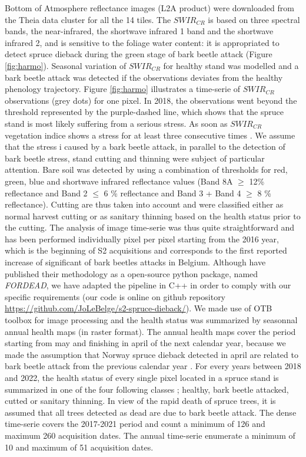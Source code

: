 \documentclass[3p,procedia]{elsarticle}
\begin{document}
Bottom of Atmosphere reflectance images (L2A product) were downloaded from the Theia data cluster \citep{theia_team} for all the 14 tiles.
The $SWIR_{CR}$ is based on three spectral bands, the near-infrared, the shortwave infrared 1 band and the shortwave infrared 2, and is sensitive to the foliage water content: it is appropriated to detect spruce dieback during the green stage of bark beetle attack (Figure \ref{fig:harmo}).
Seasonal variation of $SWIR_{CR}$ for healthy stand was modelled and a bark beetle attack was detected if the observations deviates from the healthy phenology trajectory. 
Figure \ref{fig:harmo} illustrates a time-serie of $SWIR_{CR}$ observations (grey dots) for one pixel. 
In 2018, the observations went beyond the threshold represented by the purple-dashed line, which shows that the spruce stand is most likely suffering from a serious stress.
As soon as $SWIR_{CR}$ vegetation indice shows a stress for at least three consecutive times \cite{dutrieux_package_2021}.
We assume that the stress i caused by a bark beetle attack, in parallel to the detection of bark beetle stress, stand cutting and thinning were subject of particular attention. 
Bare soil was detected by using a combination of thresholds for red, green, blue and shortwave infrared reflectance values (Band 8A $\geq$ 12\% reflectance and Band 2 $\leq$ 6 \% reflectance and Band 3 + Band 4 $\geq$ 8 \% reflectance).
Cutting are thus taken into account and were classified either as normal harvest cutting or as sanitary thinning based on the health status prior to the cutting.
The analysis of image time-serie was thus quite straightforward and has been performed individually pixel per pixel starting from the 2016 year, which is the beginning of S2 acquisitions and corresponds to the first reported increase of significant of bark beetles attacks in Belgium. 
Although \cite{dutrieux_package_2021} have published their methodology as a open-source python package, named \textit{FORDEAD}, we have adapted the pipeline in C++ in order to comply with our specific requirements (our code is online on github repository \url{https://github.com/JoLeBelge/s2-spruce-dieback/}). 
We made use of OTB toolbox \citep{grizonnet_2017_OTB} for image processing and the health status was summarized by seasonnal annual health maps (in raster format).
The annual health maps cover the period starting from may and finishing in april of the next calendar year, because we made the assumption that Norway spruce dieback detected in april are related to bark beetle attack from the previous calendar year \citep{muller_features_2022}.
For every years between 2018 and 2022, the health status of every single pixel located in a spruce stand is summarized in one of the four following classes ; healthy, bark beetle attacked, cutted or sanitary thinning.
In view of the rapid death of spruce trees, it is assumed that all trees detected as dead are due to bark beetle attack.
The dense time-serie covers the 2017-2021 period and count a minimum of 126 and maximum 260 acquisition dates. 
The annual time-serie enumerate a minimum of 10 and maximum of 51 acquisition dates. 
 
\end{document}
